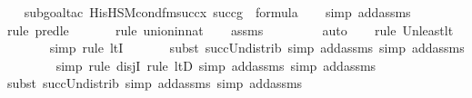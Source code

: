 \begin{isabellebody}
\ \ \isamarkupfalse%
{\isacharparenleft}{\kern0pt}subgoal{\isacharunderscore}{\kern0pt}tac\ {\isachardoublequoteopen}His{\isacharunderscore}{\kern0pt}HS{\isacharunderscore}{\kern0pt}M{\isacharunderscore}{\kern0pt}cond{\isacharunderscore}{\kern0pt}fm{\isacharprime}{\kern0pt}{\isacharparenleft}{\kern0pt}succ{\isacharparenleft}{\kern0pt}x{\isacharprime}{\kern0pt}{\isacharparenright}{\kern0pt}{\isacharcomma}{\kern0pt}\ succ{\isacharparenleft}{\kern0pt}g{\isacharparenright}{\kern0pt}{\isacharparenright}{\kern0pt}\ {\isasymin}\ formula{\isachardoublequoteclose}{\isacharparenright}{\kern0pt}\isanewline
\ \ \isamarkupfalse%
\ {\isacharparenleft}{\kern0pt}simp\ add{\isacharcolon}{\kern0pt}assms{\isacharparenright}{\kern0pt}\isanewline
\ \ \ \isamarkupfalse%
{\isacharparenleft}{\kern0pt}rule\ pred{\isacharunderscore}{\kern0pt}le{\isacharparenright}{\kern0pt}\isanewline
\ \ \ \ \ \isamarkupfalse%
\ {\isacharparenleft}{\kern0pt}rule\ union{\isacharunderscore}{\kern0pt}in{\isacharunderscore}{\kern0pt}nat{\isacharparenright}{\kern0pt}{\isacharplus}{\kern0pt}\isanewline
\ \ \isamarkupfalse%
\ assms\isanewline
\ \ \ \ \ \ \ \isamarkupfalse%
\ auto{\isacharbrackleft}{\kern0pt}{}{\isacharbrackright}{\kern0pt}\isanewline
\ \ \ \isamarkupfalse%
{\isacharparenleft}{\kern0pt}rule\ Un{\isacharunderscore}{\kern0pt}least{\isacharunderscore}{\kern0pt}lt{\isacharparenright}{\kern0pt}{\isacharplus}{\kern0pt}\isanewline
\ \ \ \ \ \isamarkupfalse%
\ {\isacharparenleft}{\kern0pt}simp{\isacharcomma}{\kern0pt}\ rule\ ltI{\isacharparenright}{\kern0pt}\isanewline
\ \ \ \ \ \ \isamarkupfalse%
{\isacharparenleft}{\kern0pt}subst\ succ{\isacharunderscore}{\kern0pt}Un{\isacharunderscore}{\kern0pt}distrib{\isacharcomma}{\kern0pt}\ simp\ add{\isacharcolon}{\kern0pt}assms{\isacharcomma}{\kern0pt}\ simp\ add{\isacharcolon}{\kern0pt}assms{\isacharparenright}{\kern0pt}{\isacharplus}{\kern0pt}\isanewline
\ \ \ \ \ \ \isamarkupfalse%
\ {\isacharparenleft}{\kern0pt}simp{\isacharcomma}{\kern0pt}\ rule\ disjI{}{\isacharcomma}{\kern0pt}\ rule\ ltD{\isacharcomma}{\kern0pt}\ simp\ add{\isacharcolon}{\kern0pt}assms{\isacharcomma}{\kern0pt}\ simp\ add{\isacharcolon}{\kern0pt}assms{\isacharparenright}{\kern0pt}\isanewline
\ \ \ \ \isamarkupfalse%
{\isacharparenleft}{\kern0pt}subst\ succ{\isacharunderscore}{\kern0pt}Un{\isacharunderscore}{\kern0pt}distrib{\isacharcomma}{\kern0pt}\ simp\ add{\isacharcolon}{\kern0pt}assms{\isacharcomma}{\kern0pt}\ simp\ add{\isacharcolon}{\kern0pt}assms{\isacharparenright}{\kern0pt}{\isacharplus}{\kern0pt}\isanewline

\end{isabellebody}
